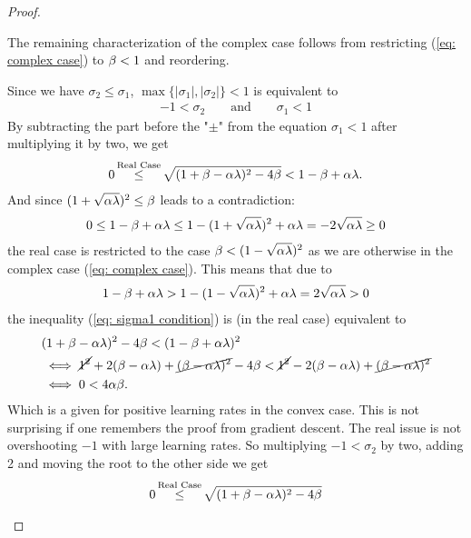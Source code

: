 \begin{proof}
\begin{description}[wide, labelindent=0pt]
		The remaining characterization of the complex case follows from
		restricting (\ref{eq: complex case}) to \(\beta<1\) and reordering.
		\item[Real Case:] Since we have \(\sigma_2 \le \sigma_1\),
		\(\max\{|\sigma_1|,|\sigma_2|\}<1\) is equivalent to
		\begin{align*}
			-1 < \sigma_2 \qquad \text{and} \qquad \sigma_1 < 1
		\end{align*}
		By subtracting the part before the "\(\pm\)" from the equation \(\sigma_1<1\)
		after multiplying it by two, we get
		\begin{align}\label{eq: sigma1 condition}
			0\xle{\text{Real Case}} \sqrt{(1+\momCoeff-\lrSq\hesseEV)^2 -4\momCoeff} < 1-\momCoeff +\lrSq\hesseEV.
		\end{align}
		And since \((1+\sqrt{\alpha\lambda})^2 \le \beta\) leads to a contradiction:
		\begin{align*}
			0 \le 1-\beta+\alpha\lambda \le 1-(1+\sqrt{\alpha\lambda})^2 +\alpha\lambda
			= -2\sqrt{\alpha\lambda} \ge 0
		\end{align*}
		the real case is restricted to the case \(\beta < (1-\sqrt{\alpha\lambda})^2\)
		as we are otherwise in the complex case (\ref{eq: complex case}).
		This means that due to
		\begin{align*}
			1-\beta+\alpha\lambda
			> 1 - (1-\sqrt{\alpha\lambda})^2 + \alpha\lambda
			= 2\sqrt{\alpha\lambda}>0
		\end{align*}
		the inequality (\ref{eq: sigma1 condition}) is (in the real case) equivalent to
		\begin{align*}
			&(1+\beta-\alpha\lambda)^2 - 4\beta < (1-\beta+\alpha\lambda)^2\\
			&\iff \cancel{1^2} + 2(\beta-\alpha\lambda) + 
			\cancel{(\beta-\alpha\lambda)^2} - 4\beta
			< \cancel{1^2} - 2(\beta-\alpha\lambda) + 
			\cancel{(\beta-\alpha\lambda)^2}\\
			&\iff 0 < 4\alpha\beta.
		\end{align*}
		Which is a given for positive learning rates in the convex	
		case. This is not surprising if one remembers the proof from gradient
		descent. The real issue is not overshooting \(-1\) with large learning
		rates. So multiplying \(-1<\sigma_2\) by two, adding 2 and moving the
		root to the other side we get
		\begin{align}\label{eq: from -1<sigma_2 followed}
			0 \xle{\text{Real Case}} \sqrt{(1+\momCoeff-\lrSq\hesseEV)^2 - 4\momCoeff}

\end{align}
\end{description}
\end{proof}
